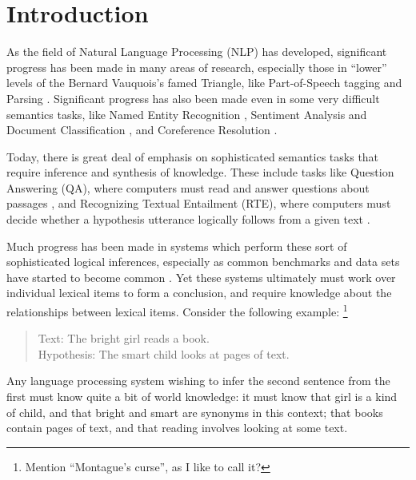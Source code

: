 \documentclass[letterpaper]{article}
\begin{document}
\tableofcontents
\pagebreak

\section{Introduction}

As the field of Natural Language Processing (NLP) has developed, significant
progress has been made in many areas of research, especially those in ``lower''
levels of the Bernard Vauquois's famed Triangle, like Part-of-Speech tagging
\cite{toutanova:2003:naacl} and Parsing \cite{chen:2014:emnlp}.  Significant progress
has also been made even in some very difficult semantics tasks,
like Named Entity Recognition \cite{needcite}, Sentiment Analysis
\cite{socher:2013:nips} and Document Classification \cite{zhang:2016:naacl},
and Coreference Resolution \cite{durrett:2013:emnlp}.

Today, there is great deal of emphasis on sophisticated semantics
tasks that require inference and synthesis of knowledge. These include tasks
like Question Answering (QA), where computers must read and answer questions
about passages \cite{hermann:2015:nips,needcite}, and Recognizing Textual
Entailment (RTE), where computers must decide whether a hypothesis utterance
logically follows from a given text
\cite{marelli:2014:semeval,bowman:2015:emnlp,beltagy:2016:cl}.

Much progress has been made in systems which perform these sort of sophisticated
logical inferences, especially as common benchmarks and data sets have started
to become common \cite{marelli:2014:semeval,bowman:2015:emnlp}. Yet these
systems ultimately must work over individual lexical items to form a
conclusion, and require knowledge about the relationships between lexical
items. Consider the following example:
\footnote{Mention ``Montague's curse'', as I like to call it?}
\begin{quote}
  Text: The bright girl reads a book.\\
  Hypothesis: The smart child looks at pages of text.
\end{quote}
Any language processing system wishing to infer the second sentence from
the first must know quite a bit of world knowledge: it must know that
girl is a kind of child, and that bright and smart are synonyms in this
context; that books contain pages of text, and that reading involves looking
at some text.
\end{document}
